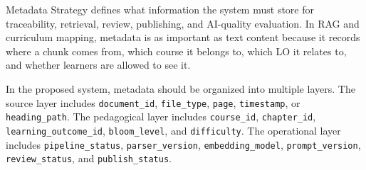 Metadata Strategy defines what information the system must store for
traceability, retrieval, review, publishing, and AI-quality evaluation.
In RAG and curriculum mapping, metadata is as important as text content
because it records where a chunk comes from, which course it belongs to,
which LO it relates to, and whether learners are allowed to see it.

In the proposed system, metadata should be organized into multiple layers.
The source layer includes \texttt{document\_id}, \texttt{file\_type},
\texttt{page}, \texttt{timestamp}, or \texttt{heading\_path}. The
pedagogical layer includes \texttt{course\_id}, \texttt{chapter\_id},
\texttt{learning\_outcome\_id}, \texttt{bloom\_level}, and
\texttt{difficulty}. The operational layer includes
\texttt{pipeline\_status}, \texttt{parser\_version},
\texttt{embedding\_model}, \texttt{prompt\_version},
\texttt{review\_status}, and \texttt{publish\_status}.

